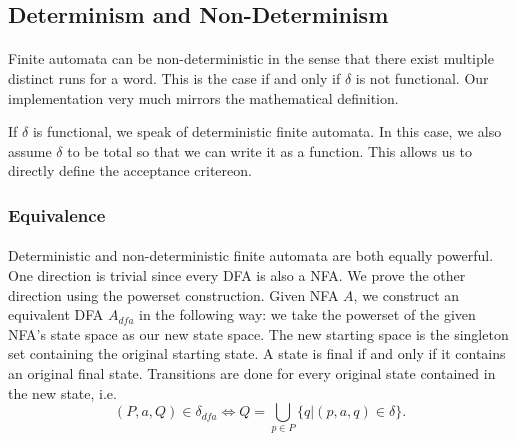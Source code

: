 \documentclass[11pt,a4paper,oneside]{book}
\begin{document}
            \subsection{Determinism and Non-Determinism}
                \paragraph{} 
                Finite automata can be non-deterministic in the sense that there exist multiple distinct runs for a word. This is the case if and only if $\delta$ is not functional. Our implementation very much mirrors the mathematical definition.



                If $\delta$ is functional, we speak of deterministic finite automata. In this case, we also assume $\delta$ to be total so that we can write it as a function. 
                This allows us to directly define the acceptance critereon. 


                \subsubsection{Equivalence}
                    \paragraph{} 
                        Deterministic and non-deterministic finite automata are both equally powerful. 
                        One direction is trivial since every DFA is also a NFA. 
                        We prove the other direction using the powerset construction. 
                        Given NFA $A$, we construct an equivalent DFA $A_{dfa}$ in the following way: 
                        we take the powerset of the given NFA's state space as our new state space. 
                        The new starting space is the singleton set containing the original starting state. 
                        A state is final if and only if it contains an original final state. 
                        Transitions are done for every original state contained in the new state, i.e. 
                        \[
                            (P, a, Q) \in \delta_{dfa} \Longleftrightarrow Q = \bigcup \limits _{p \in P} \{ q | (p,a,q) \in \delta \}.
                        \]
\end{document}
